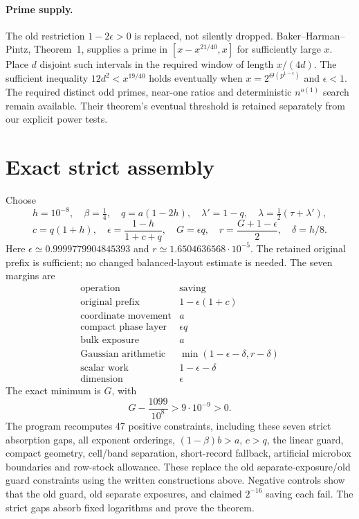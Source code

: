 \documentclass[11pt]{article}
\begin{document}
\paragraph{Prime supply.}
The old restriction $1-2\epsilon>0$ is replaced, not silently dropped.
Baker--Harman--Pintz, Theorem~1, supplies a prime in
$[x-x^{21/40},x]$ for sufficiently large $x$.
Place $d$ disjoint such intervals in the required window of length
$x/(4d)$. The sufficient inequality $12d^2<x^{19/40}$ holds eventually
when $x=2^{\Theta(p^{1-\epsilon})}$ and $\epsilon<1$.
The required distinct odd primes, near-one ratios and deterministic
$n^{o(1)}$ search remain available. Their theorem's eventual threshold
is retained separately from our explicit power tests.

\section{Exact strict assembly}
Choose
\[
 h=10^{-8},\quad\beta=\tfrac14,\quad q=a(1-2h),\quad
 \lambda'=1-q,\quad\lambda=\tfrac12(\tau+\lambda'),
\]
\[
 c=q(1+h),\quad\epsilon=\frac{1-h}{1+c+q},\quad
 G=\epsilon q,\quad r=\frac{G+1-\epsilon}{2},\quad\delta=h/8.
\]
Here $\epsilon\simeq0.9999779904845393$ and
$r\simeq1.6504636568\cdot10^{-5}$. The retained original prefix is
sufficient; no changed balanced-layout estimate is needed. The seven
margins are
\[
\begin{array}{c|c}
\text{operation}&\text{saving}\\\hline
\text{original prefix}&1-\epsilon(1+c)\\
\text{coordinate movement}&a\\
\text{compact phase layer}&\epsilon q\\
\text{bulk exposure}&a\\
\text{Gaussian arithmetic}&\min(1-\epsilon-\delta,r-\delta)\\
\text{scalar work}&1-\epsilon-\delta\\
\text{dimension}&\epsilon
\end{array}
\]
The exact minimum is $G$, with
\[
 G-\frac{1099}{10^8}>9\cdot10^{-9}>0.
\]
The program recomputes 47 positive constraints, including these seven
strict absorption gaps, all exponent orderings, $(1-\beta)b>a$,
$c>q$, the linear guard, compact geometry, cell/band separation,
short-record fallback, artificial microbox boundaries and row-stock
allowance. These replace the old separate-exposure/old guard constraints
using the written constructions above. Negative controls show that the
old guard, old separate exposures, and claimed $2^{-16}$ saving each fail.
The strict gaps absorb fixed logarithms and prove the theorem.
\end{document}

